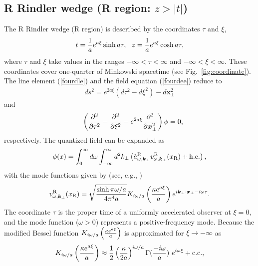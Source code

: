 \documentclass[aps,prd,preprintnumbers,nofootinbib,showpacs,11pt]{revtex4}%
\begin{document}
\begin{widetext}
\subsection{R Rindler wedge (R region: $z>|t|$)}
The R Rindler wedge (R region) is described by the coordinates $\tau$ and $\xi$, 
\begin{eqnarray}
t={1\over a}e^{a\xi}\sinh a\tau,~~
z={1\over a}e^{a\xi}\cosh a\tau,
\end{eqnarray}
where $\tau$ and $\xi$ take values in the ranges $-\infty<\tau <\infty$ and $-\infty<\xi<\infty$.
These coordinates cover one-quarter of Minkowski spacetime (see Fig.~\ref{fig:coordinate}). 
The line element (\ref{fourdle}) and the field equation (\ref{fourdee}) reduce to
\begin{eqnarray}
ds^2=e^{2a\xi}(d\tau^2-d\xi^2)-d\bm x_\perp^2
\end{eqnarray}
and 
\begin{eqnarray}
&&\left({\partial^2\over \partial \tau^2}-{\partial^2\over \partial \xi^2}
-e^{2a\xi}{\partial^2\over \partial \bm x_\perp^2}\right)\phi=0,
\label{fourdeeR}
\end{eqnarray}
respectively. The quantized field can be expanded as
\begin{eqnarray}
\phi(x)=\int_{0}^{\infty} d \omega\int_{-\infty}^{\infty} d^2 k_\perp \left( {\hat a}_{\omega,{\bm k}_\perp}^{\rm R} v_{\omega,{\bm k}_\perp}^\R(x_\R)
+{\rm h.c.}
\right),
\label{qfR}
\end{eqnarray}
with the mode functions given by (see, e.g., \cite{Higuchi})
\begin{eqnarray}
v_{\omega,{\bm k}_\perp}^\R(x_\R)=\sqrt{\sinh \pi \omega/a\over 4\pi^4 a}
K_{i\omega/a}\left({\kappa e^{a\xi}\over a}\right)e^{i\bm k_\perp\cdot \bm x_\perp-i\omega\tau}.
\label{mfR}
\end{eqnarray}
The coordinate $\tau$ is the proper time of a uniformly accelerated observer at $\xi=0$,
and the mode function ($\omega>0$) represents a positive-frequency mode. 
Because the modified Bessel function 
$K_{i\omega/a}\left({\kappa e^{a\xi}\over a}\right)$ is approximated for 
 $\xi \rightarrow - \infty$ as 
\begin{eqnarray}
K_{i\omega/a}\left({\kappa e^{a\xi}\over a}\right) \approx
\frac{1}{2}\left( \frac{\kappa}{2a} \right)^{i \omega/a} \Gamma(\frac{-i\omega}{a}) \ e^{i \omega \xi} + {\rm c.c.},
\end{eqnarray}

\end{widetext}
\end{document}
